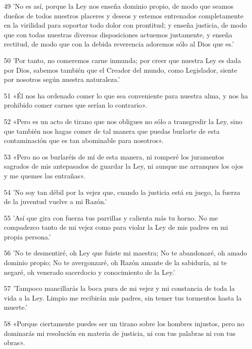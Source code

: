 \par 49 'No es así, porque la Ley nos enseña dominio propio, de modo que seamos dueños de todos nuestros placeres y deseos y estemos entrenados completamente en la virilidad para soportar todo dolor con prontitud; y enseña justicia, de modo que con todas nuestras diversas disposiciones actuemos justamente, y enseña rectitud, de modo que con la debida reverencia adoremos sólo al Dios que es.'

\par 50 'Por tanto, no comeremos carne inmunda; por creer que nuestra Ley es dada por Dios, sabemos también que el Creador del mundo, como Legislador, siente por nosotros según nuestra naturaleza.'

\par 51 «Él nos ha ordenado comer lo que sea conveniente para nuestra alma, y ​​nos ha prohibido comer carnes que serían lo contrario».

\par 52 «Pero es un acto de tirano que nos obligues no sólo a transgredir la Ley, sino que también nos hagas comer de tal manera que puedas burlarte de esta contaminación que es tan abominable para nosotros».

\par 53 «Pero no os burlaréis de mí de esta manera, ni romperé los juramentos sagrados de mis antepasados ​​de guardar la Ley, ni aunque me arranques los ojos y me quemes las entrañas».

\par 54 'No soy tan débil por la vejez que, cuando la justicia está en juego, la fuerza de la juventud vuelve a mi Razón.'

\par 55 'Así que gira con fuerza tus parrillas y calienta más tu horno. No me compadezco tanto de mi vejez como para violar la Ley de mis padres en mi propia persona.'

\par 56 'No te desmentiré, oh Ley que fuiste mi maestra; No te abandonaré, oh amado dominio propio; No te avergonzaré, oh Razón amante de la sabiduría, ni te negaré, oh venerado sacerdocio y conocimiento de la Ley.'

\par 57 'Tampoco mancillarás la boca pura de mi vejez y mi constancia de toda la vida a la Ley. Limpio me recibirán mis padres, sin temer tus tormentos hasta la muerte.'

\par 58 «Porque ciertamente puedes ser un tirano sobre los hombres injustos, pero no dominarás mi resolución en materia de justicia, ni con tus palabras ni con tus obras».

